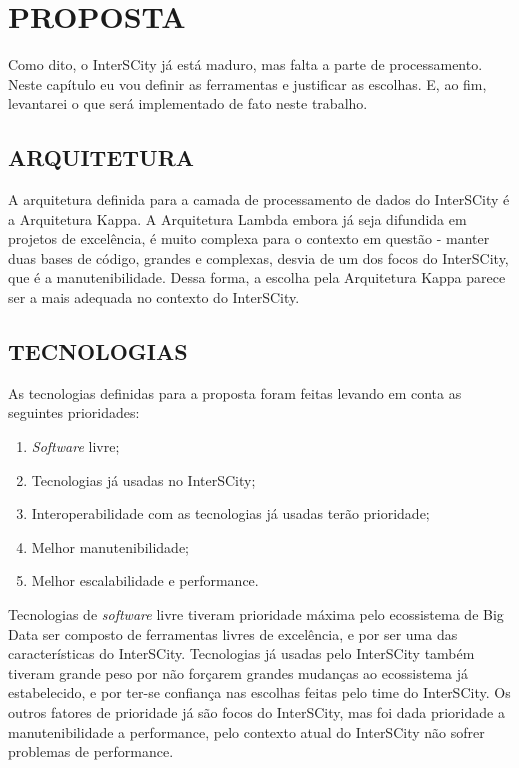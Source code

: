 \chapter[PROPOSTA]{PROPOSTA}

Como dito, o InterSCity já está maduro, mas falta a parte de processamento.
Neste capítulo eu vou definir as ferramentas e justificar as escolhas. E, ao fim,
levantarei o que será implementado de fato neste trabalho.

\section{ARQUITETURA}

A arquitetura definida para a camada de processamento de dados do InterSCity é a
Arquitetura Kappa. A Arquitetura Lambda embora já seja difundida em projetos
de excelência, é muito complexa para o contexto em questão - manter duas bases
de código, grandes e complexas, desvia de um dos focos do InterSCity, que é a
manutenibilidade. Dessa forma, a escolha pela Arquitetura Kappa parece ser a mais
adequada no contexto do InterSCity.

\section{TECNOLOGIAS}

As tecnologias definidas para a proposta foram feitas levando em conta as
seguintes prioridades:

\begin{enumerate}
    \item \textit{Software} livre;
    \item Tecnologias já usadas no InterSCity;
    \item Interoperabilidade com as tecnologias já usadas terão prioridade;
    \item Melhor manutenibilidade;
    \item Melhor escalabilidade e performance.
\end{enumerate}

Tecnologias de \textit{software} livre tiveram prioridade máxima pelo
ecossistema de Big Data ser composto de ferramentas livres de excelência, e por
ser uma das características do InterSCity. Tecnologias já usadas pelo
InterSCity também tiveram grande peso por não forçarem grandes mudanças ao
ecossistema já estabelecido, e por ter-se confiança nas escolhas feitas pelo
time do InterSCity. Os outros fatores de prioridade já são focos do InterSCity,
mas foi dada prioridade a manutenibilidade a performance, pelo contexto atual
do InterSCity não sofrer problemas de performance.

